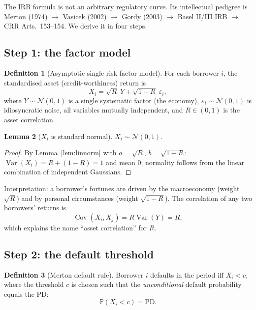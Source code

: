 \documentclass[11pt,a4paper]{report}
\theoremstyle{definition}
\newtheorem{definition}{Definition}[chapter]
\theoremstyle{plain}
\newtheorem{lemma}[definition]{Lemma}
\newcommand{\Var}{\operatorname{Var}}
\newcommand{\PD}{\mathrm{PD}}
\begin{document}
The IRB formula is not an arbitrary regulatory curve. Its intellectual
pedigree is Merton (1974) $\to$ Vasicek (2002) $\to$ Gordy (2003)
$\to$ Basel II/III IRB $\to$ CRR Arts.~153--154. We derive it in four
steps.

\subsection{Step 1: the factor model}

\begin{definition}[Asymptotic single risk factor model]
For each borrower $i$, the standardised asset (credit-worthiness) return
is
\begin{equation}
  X_i=\sqrt{R}\;Y+\sqrt{1-R}\;\varepsilon_i ,
  \label{eq:asrf}
\end{equation}
where $Y\sim\mathcal{N}(0,1)$ is a single systematic factor (the
economy), $\varepsilon_i\sim\mathcal{N}(0,1)$ is idiosyncratic noise,
all variables mutually independent, and $R\in(0,1)$ is the asset
correlation.
\end{definition}

\begin{lemma}[$X_i$ is standard normal]
\label{lem:standardnormal}
$X_i\sim\mathcal{N}(0,1)$.
\end{lemma}

\begin{proof}
By Lemma~\ref{lem:linnorm} with $a=\sqrt R$, $b=\sqrt{1-R}$:
$\Var(X_i)=R+(1-R)=1$ and mean $0$; normality follows from the linear
combination of independent Gaussians.
\end{proof}

Interpretation: a borrower's fortunes are driven by the macroeconomy
(weight $\sqrt R$) and by personal circumstances (weight
$\sqrt{1-R}$). The correlation of any two borrowers' returns is
\begin{equation}
  \operatorname{Cov}(X_i,X_j)=R\Var(Y)=R,
\end{equation}
which explains the name ``asset correlation'' for $R$.

\subsection{Step 2: the default threshold}

\begin{definition}[Merton default rule]
Borrower $i$ defaults in the period iff $X_i<c$, where the threshold $c$
is chosen such that the \emph{unconditional} default probability equals
the PD:
\begin{equation}
  \mathbb{P}(X_i<c)=\PD .
\end{equation}
\end{definition}
\end{document}
